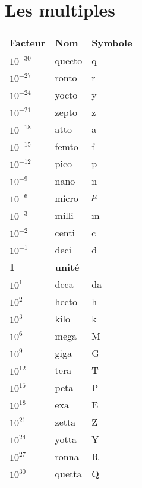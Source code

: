 \section{Les multiples}
\smallskip
\begin{center}
\bgroup
\def\arraystretch{1.2}%
\begin{tabular}{|p{}>{\centering}p{}>{\centering\arraybackslash}p{}|}
	\hline
	\textbf{Facteur} & \textbf{Nom} & \textbf{Symbole}  \\
	\hline
	\hline
	$10^{-30}$ & quecto & q \\
	$10^{-27}$ & ronto & r \\
	$10^{-24}$ & yocto & y \\
	$10^{-21}$ & zepto & z \\
	$10^{-18}$ & atto & a \\
	$10^{-15}$ & femto & f \\
	$10^{-12}$ & pico & p \\
	$10^{-9}$ & nano & n \\
	$10^{-6}$ & micro & $\mu$ \\
	$10^{-3}$ & milli & m \\
	$10^{-2}$ & centi & c \\
	$10^{-1}$ & deci & d \\
	\textbf{1} & \textbf{unité} & \\
	$10^{1}$ & deca & da \\
	$10^{2}$ & hecto & h \\
	$10^{3}$ & kilo & k \\
	$10^{6}$ & mega & M \\
	$10^{9}$ & giga & G \\
	$10^{12}$ & tera & T \\
	$10^{15}$ & peta & P \\
	$10^{18}$ & exa & E \\
	$10^{21}$ & zetta & Z \\
	$10^{24}$ & yotta & Y \\
	$10^{27}$ & ronna & R \\
	$10^{30}$ & quetta & Q \\
	\hline
\end{tabular}
\egroup
\end{center}

